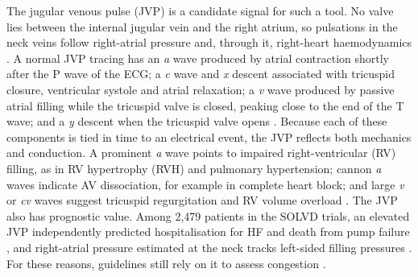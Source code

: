 \documentclass[11pt]{article}
\begin{document}
The jugular venous pulse (JVP) is a candidate signal for such a tool. No valve lies between the internal jugular vein and the right atrium, so pulsations in the neck veins follow right-atrial pressure and, through it, right-heart haemodynamics \cite{applefeld1990jugular,chuachiaco2013jugular,constant2000using,devine2007jugular}. A normal JVP tracing has an \textit{a} wave produced by atrial contraction shortly after the P wave of the ECG; a \textit{c} wave and \textit{x} descent associated with tricuspid closure, ventricular systole and atrial relaxation; a \textit{v} wave produced by passive atrial filling while the tricuspid valve is closed, peaking close to the end of the T wave; and a \textit{y} descent when the tricuspid valve opens \cite{applefeld1990jugular,chuachiaco2013jugular,ranganathan2023jugular}. Because each of these components is tied in time to an electrical event, the JVP reflects both mechanics and conduction. A prominent \textit{a} wave points to impaired right-ventricular (RV) filling, as in RV hypertrophy (RVH) and pulmonary hypertension; cannon \textit{a} waves indicate AV dissociation, for example in complete heart block; and large \textit{v} or \textit{cv} waves suggest tricuspid regurgitation and RV volume overload \cite{applefeld1990jugular,devine2007jugular,mcgee2018inspection,morin2017extreme,tung2016cannon,mansoor2015kussmaul}. The JVP also has prognostic value. Among 2,479 patients in the SOLVD trials, an elevated JVP independently predicted hospitalisation for HF and death from pump failure \cite{drazner2001prognostic}, and right-atrial pressure estimated at the neck tracks left-sided filling pressures \cite{drazner2008value,butman1993bedside}. For these reasons, guidelines still rely on it to assess congestion \cite{mcdonagh2021esc,gheorghiade2010assessing,thibodeau2018role}.
\end{document}
